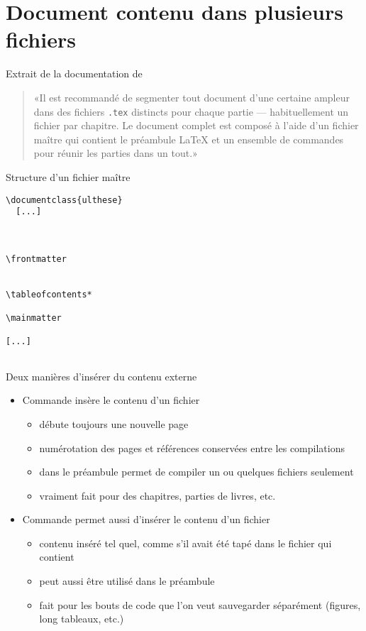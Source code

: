 \chapter{Document contenu dans plusieurs fichiers}

Extrait de la documentation de 
\begin{quote}
  «Il est recommandé de segmenter tout document d'une certaine ampleur
  dans des fichiers \verb=.tex= distincts pour chaque partie ---
  habituellement un fichier par chapitre. Le document complet est
  composé à l'aide d'un fichier maître qui contient le préambule
  {\LaTeX} et un ensemble de commandes \verb== pour réunir les
  parties dans un tout.»
\end{quote}

Structure d'un fichier maître
\begin{lstlisting}
\documentclass{ulthese}
  [...]



\frontmatter


\tableofcontents*

\mainmatter

[...]


\end{lstlisting}

Deux manières d'insérer du contenu externe
  \begin{itemize}
  \item Commande \verb== insère le contenu d'un fichier
    \begin{itemize}
    \item débute toujours une nouvelle page
    \item numérotation des pages et références conservées entre les
      compilations
    \item \verb== dans le préambule permet de compiler un
      ou quelques fichiers seulement
    \item vraiment fait pour des chapitres, parties de livres, etc.
    \end{itemize}
  \item Commande \verb== permet aussi d'insérer le contenu d'un
    fichier
    \begin{itemize}
    \item contenu inséré tel quel, comme s'il avait été tapé dans le
      fichier qui contient \verb==
    \item peut aussi être utilisé dans le préambule
    \item fait pour les bouts de code que l'on veut sauvegarder
      séparément (figures, long tableaux, etc.)
    \end{itemize}
  \end{itemize}

